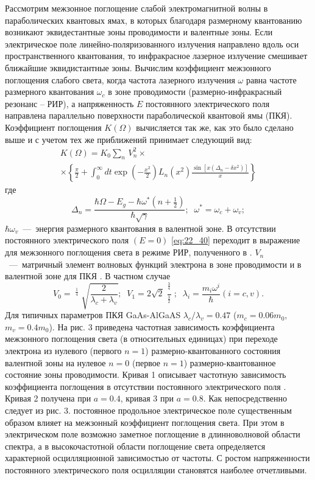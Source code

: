 {Рассмотрим межзонное поглощение слабой электромагнитной волны в параболических квантовых ямах, в которых благодаря размерному квантованию возникают эквидестантные зоны проводимости и валентные зоны. Если электрическое поле линейно-поляризованного излучения направлено вдоль оси пространственного квантования, то инфракрасное лазерное излучение смешивает ближайшие эквидистантные зоны. Вычислим коэффициент межзонного поглощения слабого света, когда частота лазерного излучения $\omega $ равна частоте размерного квантования $\omega _{c} $ в зоне проводимости (размерно-инфракрасный резонанс -- РИР), а напряженность $E$ постоянного электрического поля направлена параллельно поверхности параболической квантовой ямы (ПКЯ). Коэффициент поглощения $K(\Omega )$ вычисляется так же, как это было сделано выше и с учетом тех же приближений принимает следующий вид: 
\begin{multline} \label{eq:22_40} 
K(\Omega )=K_{0} \sum _{n} \, V_{n}^{2} \times  \\
\times \left\{\frac{\pi }{2} +\int _{0}^{\infty } dt \exp \left(-\frac{x^{2} }{2} \right)L_{n} \left(x^{2} \right)\frac{\sin \left[x\left(\Delta _{n} -\delta x^{2} \right)\right]}{x} \right\}
\end{multline} 
где 
\[\Delta _{n} =\frac{\hbar \Omega -E_{g} -\hbar \omega ^{*} \left(n+{\tfrac{1}{2}} \right)}{\hbar \sqrt{\gamma } } ;\; \; \omega ^{*} =\omega _{c} +\omega _{v} ;\] 
$\hbar \omega _{v} $~---~энергия размерного квантования в валентной зоне. В отсутствии постоянного электрического поля $(E=0)$ \eqref{eq:22_40} переходит в выражение для межзонного поглощения света в режиме РИР, полученного в \cite{Sinyavskii2002}. $V_{n} $~---~матричный элемент волновых функций электрона в зоне проводимости и в валентной зоне для ПКЯ \cite{Sinyavskii2002}. В частном случае 
\[V_{0} =\mathop{\left(\lambda _{c} \lambda _{v} \right)}\nolimits^{{\tfrac{1}{4}} } \sqrt{\frac{2}{\lambda _{c} +\lambda _{v} } } ;\; \; V_{1} =2\sqrt{2} \frac{\mathop{\left(\lambda _{c} \lambda _{v} \right)}\nolimits^{{\tfrac{3}{4}} } }{\mathop{\left(\lambda _{c} +\lambda _{v} \right)}\nolimits^{{\tfrac{3}{2}} } } ;\; \; \lambda _{i} =\frac{m_{i} \omega ^{i} }{\hbar } (i=c,v).\] 
Для типичных параметров ПКЯ GaAs-AlGaAS $\lambda _{c} /\lambda _{v} =0.47$ ($m_{c} =0.06m_{0} ,$ $m_{v} =0.4m_{0} $). На рис. 3 приведена частотная зависимость коэффициента межзонного поглощения света (в относительных единицах) при переходе электрона из нулевого (первого $n=1$) размерно-квантованного состояния валентной зоны на нулевое $n=0$ (первое $n=1$) размерно-квантованное состояние зоны проводимости. Кривая 1 описывает частотную зависимость коэффициента поглощения в отсутствии постоянного электрического поля \cite{Sinyavskii2002}. Кривая 2 получена при $a=0.4$, кривая 3 при $a=0.8$. Как непосредственно следует из рис. 3. постоянное продольное электрическое поле существенным образом влияет на межзонный коэффициент поглощения света. При этом в электрическом поле возможно заметное поглощение в длинноволновой области спектра, а в высокочастотной области поглощение света определяется характерной осцилляционной зависимостью от частоты. С ростом напряженности постоянного электрического поля осцилляции становятся наиболее отчетливыми. 
}
